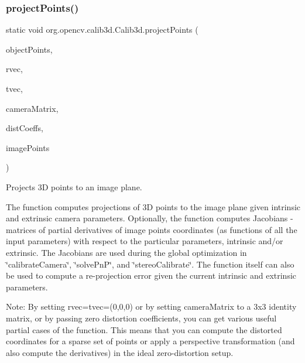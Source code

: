 \subsubsection{\texorpdfstring{project\+Points()}{projectPoints()}\hspace{0.1cm}{\footnotesize\ttfamily [2/2]}}
{\footnotesize\ttfamily static void org.\+opencv.\+calib3d.\+Calib3d.\+project\+Points (\begin{DoxyParamCaption}\item[{\mbox{\hyperlink{classorg_1_1opencv_1_1core_1_1_mat_of_point3f}{Mat\+Of\+Point3f}}}]{object\+Points,  }\item[{\mbox{\hyperlink{classorg_1_1opencv_1_1core_1_1_mat}{Mat}}}]{rvec,  }\item[{\mbox{\hyperlink{classorg_1_1opencv_1_1core_1_1_mat}{Mat}}}]{tvec,  }\item[{\mbox{\hyperlink{classorg_1_1opencv_1_1core_1_1_mat}{Mat}}}]{camera\+Matrix,  }\item[{\mbox{\hyperlink{classorg_1_1opencv_1_1core_1_1_mat_of_double}{Mat\+Of\+Double}}}]{dist\+Coeffs,  }\item[{\mbox{\hyperlink{classorg_1_1opencv_1_1core_1_1_mat_of_point2f}{Mat\+Of\+Point2f}}}]{image\+Points }\end{DoxyParamCaption})\hspace{0.3cm}{\ttfamily [static]}}

Projects 3D points to an image plane.

The function computes projections of 3D points to the image plane given intrinsic and extrinsic camera parameters. Optionally, the function computes Jacobians -\/ matrices of partial derivatives of image points coordinates (as functions of all the input parameters) with respect to the particular parameters, intrinsic and/or extrinsic. The Jacobians are used during the global optimization in \char`\"{}calibrate\+Camera\char`\"{}, \char`\"{}solve\+Pn\+P\char`\"{}, and \char`\"{}stereo\+Calibrate\char`\"{}. The function itself can also be used to compute a re-\/projection error given the current intrinsic and extrinsic parameters.

Note\+: By setting {\ttfamily rvec=tvec=(0,0,0)} or by setting {\ttfamily camera\+Matrix} to a 3x3 identity matrix, or by passing zero distortion coefficients, you can get various useful partial cases of the function. This means that you can compute the distorted coordinates for a sparse set of points or apply a perspective transformation (and also compute the derivatives) in the ideal zero-\/distortion setup.


